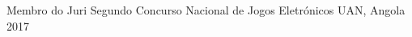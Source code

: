 


\begin{cvhonors}


\cvhonor
{Membro do Juri} %
{Segundo Concurso Nacional de Jogos Eletrónicos} %
{UAN, Angola} %
{2017} %
    

\end{cvhonors}
